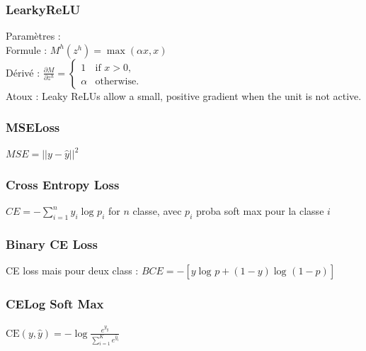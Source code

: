 \documentclass{article}
\begin{document}
\begin{multicols}{2}
\subsubsection{LearkyReLU}
Paramètres : \\
Formule : $ M^h(z^h) = \max(\alpha x, x) $ \\
Dérivé : $ \frac{\partial M}{\partial z^h} = 
    \begin{cases} 
        1 & \text{if } x>0, \\
        \alpha & \text{otherwise}.
    \end{cases}$ \\
Atoux : Leaky ReLUs allow a small, positive gradient when the unit is not active.

\subsubsection{MSELoss}
$ MSE = ||y - \hat{y}||^2 $ 

\subsubsection{Cross Entropy Loss}
$ CE = - \sum_{i=1}^{n} y_i \log_{} p_i $ for $ n $ classe, avec $ p_i $ proba soft max pour la classe $ i $ 

\subsubsection{Binary CE Loss}
CE loss mais pour deux class : $ BCE = - [ y \log_{} p + (1 - y) \log_{} (1 - p) ] $ 

\subsubsection{CELog Soft Max}
$ \displaystyle \text{CE}(y, \hat{y}) = - \log \frac {e^{\hat{y}_y}} {\sum_{i=1}^{K}e^{\hat{y}_i}} $

\end{multicols}
\end{document}
